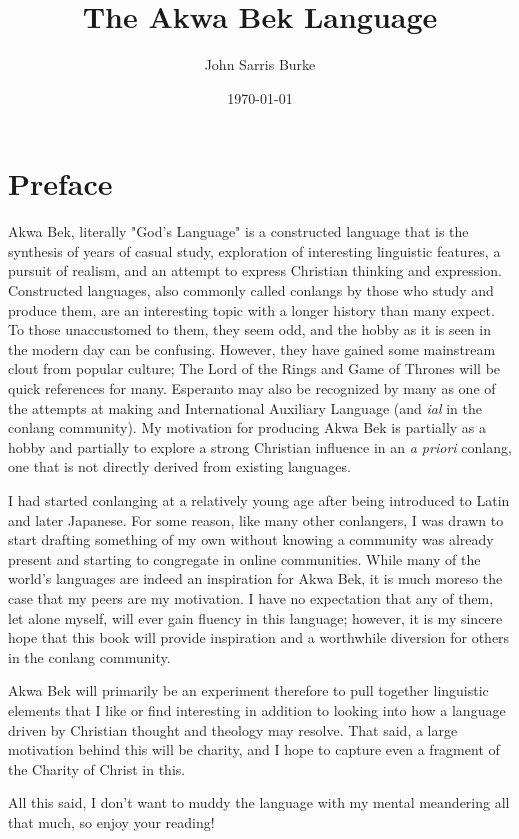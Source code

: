 \documentclass[11pt,letterpaper]{article}
\title{The Akwa Bek Language}
\date{\today}
\author{John Sarris Burke}
\begin{document}
\maketitle
\tableofcontents
\pagebreak
\pagebreak

\section{Preface}
  Akwa Bek, literally "God's Language" is a constructed language that is the synthesis of years of casual study, exploration of interesting linguistic features, a pursuit of realism, and an attempt to express Christian thinking and expression. Constructed languages, also commonly called conlangs by those who study and produce them, are an interesting topic with a longer history than many expect. To those unaccustomed to them, they seem odd, and the hobby as it is seen in the modern day can be confusing. However, they have gained some mainstream clout from popular culture; The Lord of the Rings and Game of Thrones will be quick references for many. Esperanto may also be recognized by many as one of the attempts at making and International Auxiliary Language (and \textit{ial} in the conlang community). My motivation for producing Akwa Bek is partially as a hobby and partially to explore a strong Christian influence in an \textit{a priori} conlang, one that is not directly derived from existing languages.
  \par
  I had started conlanging at a relatively young age after being introduced to Latin and later Japanese. For some reason, like many other conlangers, I was drawn to start drafting something of my own without knowing a community was already present and starting to congregate in online communities. While many of the world's languages are indeed an inspiration for Akwa Bek, it is much moreso the case that my peers are my motivation. I have no expectation that any of them, let alone myself, will ever gain fluency in this language; however, it is my sincere hope that this book will provide inspiration and a worthwhile diversion for others in the conlang community.
  \par
  Akwa Bek will primarily be an experiment therefore to pull together linguistic elements that I like or find interesting in addition to looking into how a language driven by Christian thought and theology may resolve. That said, a large motivation behind this will be charity, and I hope to capture even a fragment of the Charity of Christ in this.
  \par
  All this said, I don't want to muddy the language with my mental meandering all that much, so enjoy your reading!
\pagebreak
\end{document}
